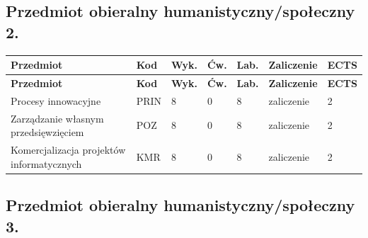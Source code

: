 \documentclass[12pt,a4paper]{article}
\newcommand{\thdrule}{\noalign{\global\setlength{\extrarowheight}{0pt}}}
\newcommand{\thdend}{\noalign{\global\setlength{\extrarowheight}{4pt}}}
\begin{document}
\subsection*{Przedmiot obieralny humanistyczny/społeczny 2.}

{\scriptsize
\begin{longtable}{m{5.5cm}m{0.8cm}m{1cm}m{1cm}m{1cm}m{1.7cm}m{0.7cm}}
\thdrule\toprule
\rowcolor{pjatkRed}
{\color{white}\footnotesize\textbf{\vphantom{Ag}Przedmiot}} & {\color{white}\footnotesize\textbf{\vphantom{Ag}Kod}} & {\color{white}\footnotesize\textbf{\vphantom{Ag}Wyk.}} & {\color{white}\footnotesize\textbf{\vphantom{Ag}Ćw.}} & {\color{white}\footnotesize\textbf{\vphantom{Ag}Lab.}} & {\color{white}\footnotesize\textbf{\vphantom{Ag}Zaliczenie}} & {\color{white}\footnotesize\textbf{\vphantom{Ag}ECTS}} \\
\midrule\thdend
\endfirsthead
\thdrule\toprule
\rowcolor{pjatkRed}
{\color{white}\footnotesize\textbf{\vphantom{Ag}Przedmiot}} & {\color{white}\footnotesize\textbf{\vphantom{Ag}Kod}} & {\color{white}\footnotesize\textbf{\vphantom{Ag}Wyk.}} & {\color{white}\footnotesize\textbf{\vphantom{Ag}Ćw.}} & {\color{white}\footnotesize\textbf{\vphantom{Ag}Lab.}} & {\color{white}\footnotesize\textbf{\vphantom{Ag}Zaliczenie}} & {\color{white}\footnotesize\textbf{\vphantom{Ag}ECTS}} \\
\midrule\thdend
\endhead
\rowcolor{tableRowLight} Procesy innowacyjne & PRIN & 8 & 0 & 8 & {\scriptsize zaliczenie} & 2 \\
\rowcolor{tableRowAlt} Zarządzanie własnym przedsięwzięciem & POZ & 8 & 0 & 8 & {\scriptsize zaliczenie} & 2 \\
\rowcolor{tableRowLight} Komercjalizacja projektów informatycznych & KMR & 8 & 0 & 8 & {\scriptsize zaliczenie} & 2 \\
\bottomrule
\end{longtable}}

\subsection*{Przedmiot obieralny humanistyczny/społeczny 3.}
\end{document}
